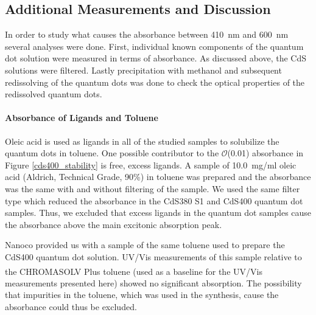 \documentclass[cits]{JINST}
\begin{document}
\subsection{Additional Measurements and Discussion}
\label{discussion_sec}
In order to study what causes the absorbance between 410~nm and 600~nm several analyses were done. First, individual known components of the quantum dot solution were measured in terms of absorbance. As discussed above, the CdS solutions were filtered. Lastly precipitation with methanol and subsequent redissolving of the quantum dots was done to check the optical properties of the redissolved quantum dots. 

\paragraph{Absorbance of Ligands and Toluene}
Oleic acid is used as ligands in all of the studied samples to solubilize the quantum dots in toluene. One possible contributor to the $\mathcal{O}$(0.01) absorbance in Figure \ref{cds400_stability} is free, excess ligands. A sample of 10.0~mg/ml oleic acid (Aldrich, Technical Grade, 90\%) in toluene was prepared and the absorbance was the same with and without filtering of the sample. We used the same filter type which reduced the absorbance in the CdS380 S1 and CdS400 quantum dot samples. Thus, we excluded that excess ligands in the quantum dot samples cause the absorbance above the main excitonic absorption peak. 

Nanoco provided us with a sample of the same toluene used to prepare the CdS400 quantum dot solution. UV/Vis measurements of this sample relative to the CHROMASOLV\textsuperscript{\textregistered} Plus toluene (used as a baseline for the UV/Vis measurements presented here) showed no significant absorption. The possibility that impurities in the toluene, which was used in the synthesis, cause the absorbance could thus be excluded.  
\end{document}
